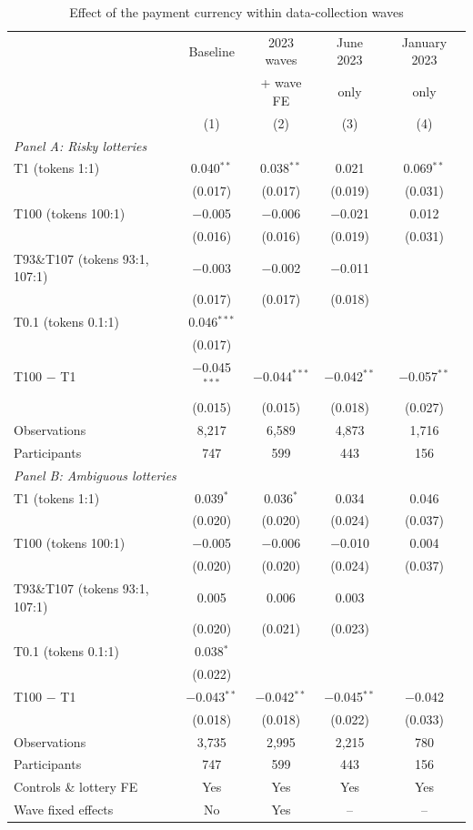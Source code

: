\begin{table}[!t]
\centering\footnotesize\renewcommand{\arraystretch}{0.92}
\caption{Effect of the payment currency within data-collection waves}
\label{tab:wave}
\begin{tabular}{lcccc}
\toprule
 & Baseline & 2023 waves & June 2023 & January 2023 \\
 & & + wave FE & only & only \\
 & (1) & (2) & (3) & (4) \\
\midrule
\multicolumn{5}{l}{\emph{Panel A: Risky lotteries}} \\
T1 (tokens 1:1) & 0.040$^{**}$ & 0.038$^{**}$ & 0.021 & 0.069$^{**}$ \\
 & (0.017) & (0.017) & (0.019) & (0.031) \\
T100 (tokens 100:1) & $-$0.005 & $-$0.006 & $-$0.021 & 0.012 \\
 & (0.016) & (0.016) & (0.019) & (0.031) \\
T93\&T107 (tokens 93:1, 107:1) & $-$0.003 & $-$0.002 & $-$0.011 &  \\
 & (0.017) & (0.017) & (0.018) &  \\
T0.1 (tokens 0.1:1) & 0.046$^{***}$ &  &  &  \\
 & (0.017) &  &  &  \\
T100 $-$ T1 & $-$0.045$^{***}$ & $-$0.044$^{***}$ & $-$0.042$^{**}$ & $-$0.057$^{**}$ \\
 & (0.015) & (0.015) & (0.018) & (0.027) \\
Observations & 8,217 & 6,589 & 4,873 & 1,716 \\
Participants & 747 & 599 & 443 & 156 \\
\midrule
\multicolumn{5}{l}{\emph{Panel B: Ambiguous lotteries}} \\
T1 (tokens 1:1) & 0.039$^{*}$ & 0.036$^{*}$ & 0.034 & 0.046 \\
 & (0.020) & (0.020) & (0.024) & (0.037) \\
T100 (tokens 100:1) & $-$0.005 & $-$0.006 & $-$0.010 & 0.004 \\
 & (0.020) & (0.020) & (0.024) & (0.037) \\
T93\&T107 (tokens 93:1, 107:1) & 0.005 & 0.006 & 0.003 &  \\
 & (0.020) & (0.021) & (0.023) &  \\
T0.1 (tokens 0.1:1) & 0.038$^{*}$ &  &  &  \\
 & (0.022) &  &  &  \\
T100 $-$ T1 & $-$0.043$^{**}$ & $-$0.042$^{**}$ & $-$0.045$^{**}$ & $-$0.042 \\
 & (0.018) & (0.018) & (0.022) & (0.033) \\
Observations & 3,735 & 2,995 & 2,215 & 780 \\
Participants & 747 & 599 & 443 & 156 \\
\midrule
Controls \& lottery FE & Yes & Yes & Yes & Yes \\
Wave fixed effects & No & Yes & -- & -- \\
\bottomrule
\end{tabular}


\end{table}
